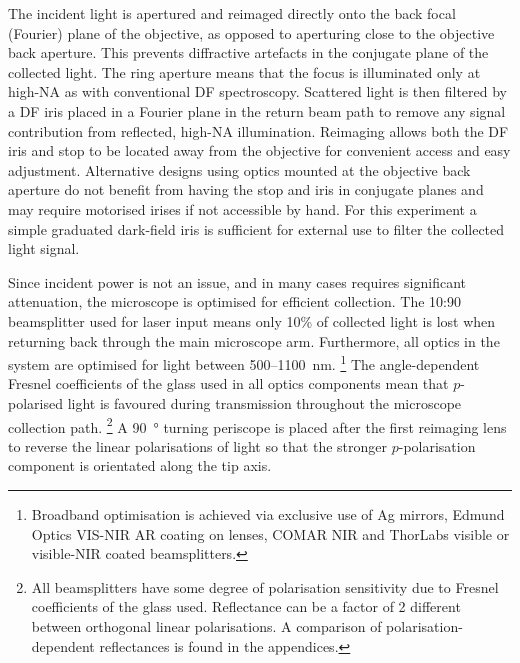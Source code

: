 \documentclass{article}
\begin{document}
The incident light is apertured and reimaged directly onto the back focal (Fourier) plane of the objective, as opposed to aperturing close to the objective back aperture. This prevents diffractive artefacts in the conjugate plane of the collected light. The ring aperture means that the focus is illuminated only at high-NA as with conventional DF spectroscopy. Scattered light is then filtered by a DF iris placed in a Fourier plane in the return beam path to remove any signal contribution from reflected, high-NA illumination. Reimaging allows both the DF iris and stop to be located away from the objective for convenient access and easy adjustment. Alternative designs using optics mounted at the objective back aperture do not benefit from having the stop and iris in conjugate planes and may require motorised irises if not accessible by hand. For this experiment a simple graduated dark-field iris is sufficient for external use to filter the collected light signal.

Since incident power is not an issue, and in many cases requires significant attenuation, the microscope is optimised for efficient collection. The 10:90 beamsplitter used for laser input means only 10\% of collected light is lost when returning back through the main microscope arm. Furthermore, all optics in the system are optimised for light between 500--\SI{1100}{nm}.%
\footnote{Broadband optimisation is achieved via exclusive use of Ag mirrors, Edmund Optics VIS-NIR AR coating on lenses, COMAR NIR and ThorLabs visible or visible-NIR coated beamsplitters.}
The angle-dependent Fresnel coefficients of the glass used in all optics components mean that $p$-polarised light is favoured during transmission throughout the microscope collection path.%
\footnote{All beamsplitters have some degree of polarisation sensitivity due to Fresnel coefficients of the glass used. Reflectance can be a factor of 2 different between orthogonal linear polarisations. A comparison of polarisation-dependent reflectances is found in the appendices.}
A \SI{90}{\degree} turning periscope is placed after the first reimaging lens to reverse the linear polarisations of light so that the stronger $p$-polarisation component is orientated along the tip axis.
\end{document}
